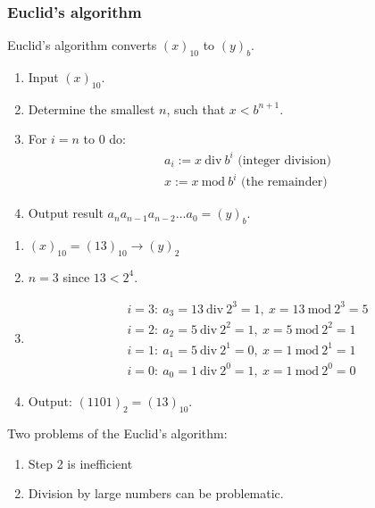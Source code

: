 \subsubsection{Euclid's algorithm}
Euclid's algorithm converts $(x)_{10}$ to $(y)_b$.
\begin{enumerate}%
    \item {
        Input $(x)_{10}$.
    }
    \item {
        Determine the smallest $n$, such that $x < b^{n+1}$.
    }
    \item {
        For $i=n$ to $0$ do:
        \begin{align*}
            &
            a_i := x\ \mathrm{div}\ b^{i} \text{ (integer division)}
            \\&
            x := x\ \mathrm{mod}\ b^{i} \text{ (the remainder)}
        \end{align*}
    }
    \item {
        Output result $a_n a_{n-1} a_{n-2} \dots a_0 = (y)_b$.
    }
\end{enumerate}

\begin{example}
    \begin{enumerate}
        \item {
            $(x)_{10} = (13)_{10} \to (y)_2$
        }
        \item {
            $n = 3$ since $13 < 2^4$.
        }
        \item {
            \begin{align*}
                &
                i = 3:\ a_3 = 13 \ \mathrm{div}\ 2^3 = 1,\
                x = 13 \ \mathrm{mod}\ 2^3 = 5
                \\&
                i = 2:\ a_2 = 5 \ \mathrm{div}\ 2^2 = 1,\
                x = 5 \ \mathrm{mod}\ 2^2 = 1
                \\&
                i = 1:\ a_1 = 5 \ \mathrm{div}\ 2^1 = 0,\
                x = 1 \ \mathrm{mod}\ 2^1 = 1
                \\&
                i = 0:\ a_0 = 1 \ \mathrm{div}\ 2^0 = 1,\
                x = 1 \ \mathrm{mod}\ 2^0 = 0
            \end{align*}
        }
        \item {
             Output: $(1101)_2 = (13)_{10}$.
        }
    \end{enumerate}
\end{example}
Two problems of the Euclid's algorithm:
\begin{enumerate}
    \item {
        Step 2 is inefficient
    }
    \item {
        Division by large numbers can be problematic.
    }
\end{enumerate}

